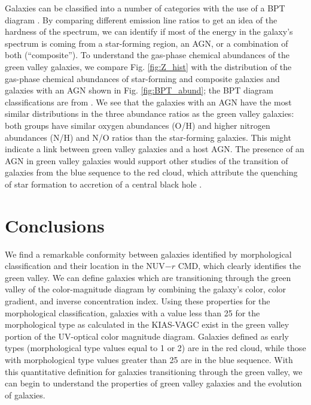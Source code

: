 Galaxies can be classified into a number of categories with the use of a BPT 
diagram \citep{Baldwin81}.  By comparing different emission line ratios to get 
an idea of the hardness of the spectrum, we can identify if most of the energy 
in the galaxy's spectrum is coming from a star-forming region, an AGN, or a 
combination of both (``composite'').  To understand the gas-phase chemical 
abundances of the green valley galaxies, we compare Fig. \ref{fig:Z_hist} with 
the distribution of the gas-phase chemical abundances of star-forming and 
composite galaxies and galaxies with an AGN shown in Fig. \ref{fig:BPT_abund}; 
the BPT diagram classifications are from \cite{Brinchmann04}.  We see that the 
galaxies with an AGN have the most similar distributions in the three abundance 
ratios as the green valley galaxies: both groups have similar oxygen abundances 
(O/H) and higher nitrogen abundances (N/H) and N/O ratios than the star-forming 
galaxies.  This might indicate a link between green valley galaxies and a host 
AGN.  The presence of an AGN in green valley galaxies would support other 
studies of the transition of galaxies from the blue sequence to the red cloud, 
which attribute the quenching of star formation to accretion of a central black 
hole \citep[e.g.,][]{Croton06,Stasinska08}.





\section[Conclusions]{Conclusions}

We find a remarkable conformity between galaxies identified by morphological 
classification and their location in the NUV$-r$ CMD, which clearly identifies 
the green valley.  We can define galaxies which are transitioning through the 
green valley of the color-magnitude diagram by combining the galaxy's color, 
color gradient, and inverse concentration index.  Using these properties for the 
morphological classification, galaxies with a value less than 25 for the 
morphological type as calculated in the KIAS-VAGC exist in the green valley 
portion of the UV-optical color magnitude diagram.  Galaxies defined as early 
types (morphological type values equal to 1 or 2) are in the red cloud, while 
those with morphological type values greater than 25 are in the blue sequence.  
With this quantitative definition for galaxies transitioning through the green 
valley, we can begin to understand the properties of green valley galaxies and 
the evolution of galaxies.

